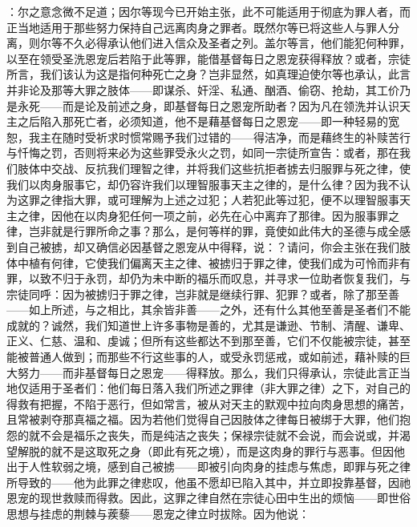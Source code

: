 \par

：尔之意念微不足道；因尔等现今已开始主张，此不可能适用于彻底为罪人者，而正当地适用于那些努力保持自己远离肉身之罪者。既然尔等已将这些人与罪人分离，则尔等不久必得承认他们进入信众及圣者之列。盖尔等言，他们能犯何种罪，以至在领受圣洗恩宠后若陷于此等罪，能借基督每日之恩宠获得释放？或者，宗徒所言，我们该认为这是指何种死亡之身？岂非显然，如真理迫使尔等也承认，此言并非论及那等大罪之肢体——即谋杀、奸淫、私通、酗酒、偷窃、抢劫，其工价乃是永死——而是论及前述之身，即基督每日之恩宠所助者？因为凡在领洗并认识天主之后陷入那死亡者，必须知道，他不是藉基督每日之恩宠——即一种轻易的宽恕，我主在随时受祈求时惯常赐予我们过错的——得洁净，而是藉终生的补赎苦行与忏悔之罚，否则将来必为这些罪受永火之罚，如同一宗徒所宣告：或者，那在我们肢体中交战、反抗我们理智之律，并将我们这些抗拒者掳去归服罪与死之律，使我们以肉身服事它，却仍容许我们以理智服事天主之律的，是什么律？因为我不认为这罪之律指大罪，或可理解为上述之过犯；人若犯此等过犯，便不以理智服事天主之律，因他在以肉身犯任何一项之前，必先在心中离弃了那律。因为服事罪之律，岂非就是行罪所命之事？那么，是何等样的罪，竟使如此伟大的圣德与成全感到自己被掳，却又确信必因基督之恩宠从中得释，说：？请问，你会主张在我们肢体中植有何律，它使我们偏离天主之律、被掳归于罪之律，使我们成为可怜而非有罪，以致不归于永罚，却仍为未中断的福乐而叹息，并寻求一位助者恢复我们，与宗徒同呼：因为被掳归于罪之律，岂非就是继续行罪、犯罪？或者，除了那至善——如上所述，与之相比，其余皆非善——之外，还有什么其他至善是圣者们不能成就的？诚然，我们知道世上许多事物是善的，尤其是谦逊、节制、清醒、谦卑、正义、仁慈、温和、虔诚；但所有这些都达不到那至善，它们不仅能被宗徒，甚至能被普通人做到；而那些不行这些事的人，或受永罚惩戒，或如前述，藉补赎的巨大努力——而非基督每日之恩宠——得释放。那么，我们只得承认，宗徒此言正当地仅适用于圣者们：他们每日落入我们所述之罪律（非大罪之律）之下，对自己的得救有把握，不陷于恶行，但如常言，被从对天主的默观中拉向肉身思想的痛苦，且常被剥夺那真福之福。因为若他们觉得自己因肢体之律每日被绑于大罪，他们抱怨的就不会是福乐之丧失，而是纯洁之丧失；保禄宗徒就不会说，而会说或，并渴望解脱的就不是这取死之身（即此有死之境），而是这肉身的罪行与恶事。但因他出于人性软弱之境，感到自己被掳——即被引向肉身的挂虑与焦虑，即罪与死之律所导致的——他为此罪之律悲叹，他虽不愿却已陷入其中，并立即投靠基督，因祂恩宠的现世救赎而得救。因此，这罪之律自然在宗徒心田中生出的烦恼——即世俗思想与挂虑的荆棘与蒺藜——恩宠之律立时拔除。因为他说：\par

